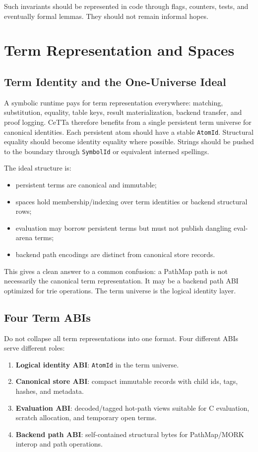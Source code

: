 \documentclass[11pt]{article}
\newcommand{\CeTTa}{CeTTa}
\newcommand{\PathMap}{PathMap}
\newcommand{\MORK}{MORK}
\begin{document}
Such invariants should be represented in code through flags, counters, tests, and eventually formal lemmas.  They should not remain informal hopes.

\section{Term Representation and Spaces}\label{sec:term-representation}

\subsection{Term Identity and the One-Universe Ideal}

A symbolic runtime pays for term representation everywhere: matching, substitution, equality, table keys, result materialization, backend transfer, and proof logging.  \CeTTa{} therefore benefits from a single persistent term universe for canonical identities.  Each persistent atom should have a stable \texttt{AtomId}.  Structural equality should become identity equality where possible.  Strings should be pushed to the boundary through \texttt{SymbolId} or equivalent interned spellings.

The ideal structure is:

\begin{itemize}[leftmargin=*]
  \item persistent terms are canonical and immutable;
  \item spaces hold membership/indexing over term identities or backend structural rows;
  \item evaluation may borrow persistent terms but must not publish dangling eval-arena terms;
  \item backend path encodings are distinct from canonical store records.
\end{itemize}

This gives a clean answer to a common confusion: a \PathMap{} path is not necessarily the canonical term representation.  It may be a backend path ABI optimized for trie operations.  The term universe is the logical identity layer.

\subsection{Four Term ABIs}

Do not collapse all term representations into one format.  Four different ABIs serve different roles:

\begin{enumerate}[leftmargin=*]
  \item \textbf{Logical identity ABI}: \texttt{AtomId} in the term universe.
  \item \textbf{Canonical store ABI}: compact immutable records with child ids, tags, hashes, and metadata.
  \item \textbf{Evaluation ABI}: decoded/tagged hot-path views suitable for C evaluation, scratch allocation, and temporary open terms.
  \item \textbf{Backend path ABI}: self-contained structural bytes for \PathMap{}/\MORK{} interop and path operations.
\end{enumerate}
\end{document}
